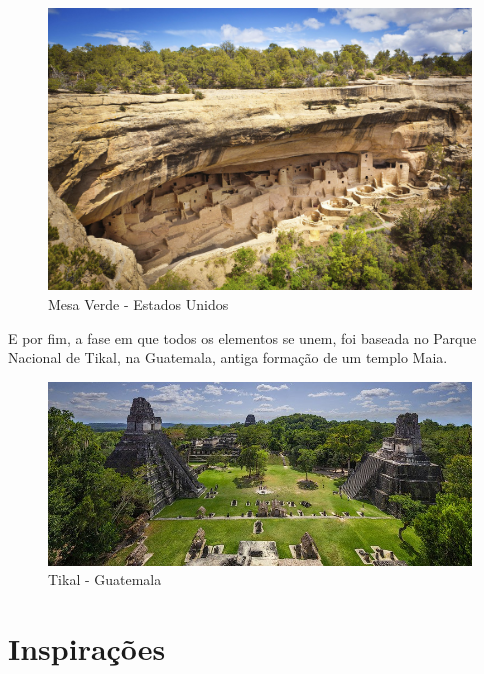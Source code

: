 \begin{figure}[htb]
    \caption{\label{fig_mundoXaman}Mesa Verde - Estados Unidos}
    \begin{center}
        \includegraphics[width=\textwidth]{imagens/mesaverde.jpg}
    \end{center}
\end{figure}

E por fim, a fase em que todos os elementos se unem, foi baseada no Parque Nacional de Tikal, na Guatemala, antiga formação de um templo Maia.

\clearpage

\begin{figure}[htb]
    \caption{\label{fig_mundoHub}Tikal - Guatemala}
    \begin{center}
        \includegraphics[width=\textwidth]{imagens/tikal.jpg}
    \end{center}
\end{figure}


\section{Inspirações}



